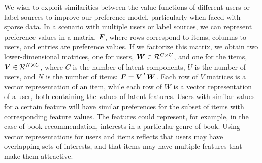 
We wish to exploit similarities between the value functions of different users or label sources to improve our preference model, particularly when faced with sparse data.
In a scenario with multiple users or label sources, 
we can represent preference values in a matrix, $\boldsymbol{F}$,
where rows correspond to items, columns to users, and entries are preference values.
If we factorize this matrix, we obtain two lower-dimensional matrices,
one for users, $\boldsymbol{W} \in \mathcal{R}^{C \times U}$, 
and one for the items, $\boldsymbol{V} \in \mathcal{R}^{N \times C}$,
where $C$ is the number of latent components, 
$U$ is the number of users, and $N$ is
the number of items: $\boldsymbol{F} = \boldsymbol{V}^T \boldsymbol{W}$.
Each row of $V$ matrices is a vector representation of an item, 
while each row of $W$ is a vector representation of a user, 
both containing the values of latent features.
Users with similar values for a certain feature will have similar preferences for 
the subset of items with corresponding feature values. 
The features could represent, for example, in the case of book recommendation, interests in a particular genre of book. 
Using vector representations for users and items reflects that users may have overlapping sets of interests,
and that items may have multiple features that make them attractive.

